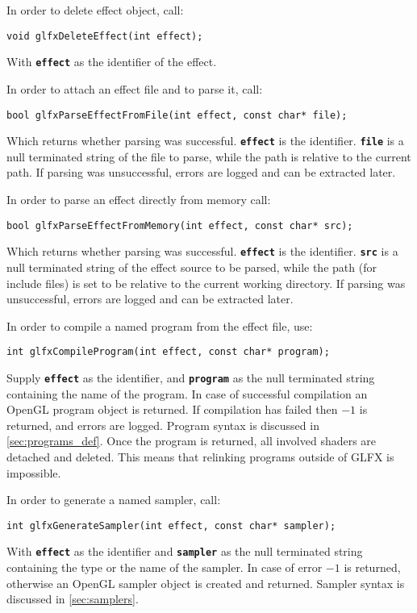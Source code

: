 \documentclass[11pt,a4paper,final,titlepage]{article}
\let\orgautoref\autoref
\renewcommand{\autoref}{%
\def\sectionautorefname{Sec.}%
\def\subsectionautorefname{Sec.}%
\def\algocflineautorefname{Alg.}%
\def\lemmaautorefname{Lemma}%
\orgautoref}
\begin{document}
In order to delete effect object, call:
\begin{lstlisting}
void glfxDeleteEffect(int effect);
\end{lstlisting}
With \texttt{\textbf{effect}} as the identifier of the effect.

In order to attach an effect file and to parse it, call:
\begin{lstlisting}
bool glfxParseEffectFromFile(int effect, const char* file);
\end{lstlisting}
Which returns whether parsing was successful. \texttt{\textbf{effect}} is the identifier.
\texttt{\textbf{file}} is a null terminated string of the file to parse, while the path is relative
to the current path. If parsing was unsuccessful, errors are logged and can be extracted later.

In order to parse an effect directly from memory call:
\begin{lstlisting}
bool glfxParseEffectFromMemory(int effect, const char* src);
\end{lstlisting}
Which returns whether parsing was successful. \texttt{\textbf{effect}} is the identifier.
\texttt{\textbf{src}} is a null terminated string of the effect source to be parsed,
while the path (for include files) is set to be relative to the current working directory.
If parsing was unsuccessful, errors are logged and can be extracted later.

In order to compile a named program from the effect file, use:

\begin{lstlisting}
int glfxCompileProgram(int effect, const char* program);
\end{lstlisting}
Supply \texttt{\textbf{effect}} as the identifier, and \texttt{\textbf{program}} as the null
terminated string containing the name of the program.
In case of successful compilation an OpenGL program object is returned. If compilation has failed
then $-1$ is returned, and errors are logged. Program syntax is discussed in \autoref{sec:programs_def}.
Once the program is returned, all involved shaders are detached and deleted. This means that relinking
programs outside of GLFX is impossible.

In order to generate a named sampler, call:

\begin{lstlisting}
int glfxGenerateSampler(int effect, const char* sampler);
\end{lstlisting}
With \texttt{\textbf{effect}} as the identifier and \texttt{\textbf{sampler}} as the null terminated
string containing the type or the name of the sampler.
In case of error $-1$ is returned, otherwise an OpenGL sampler object is created and returned.
Sampler syntax is discussed in \autoref{sec:samplers}.
\end{document}
